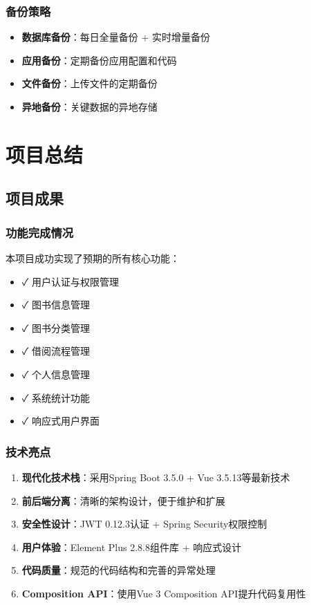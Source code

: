 \documentclass[12pt,a4paper]{article}
\begin{document}
\subsubsection{备份策略}
\begin{itemize}
    \item \textbf{数据库备份}：每日全量备份 + 实时增量备份
    \item \textbf{应用备份}：定期备份应用配置和代码
    \item \textbf{文件备份}：上传文件的定期备份
    \item \textbf{异地备份}：关键数据的异地存储
\end{itemize}

\section{项目总结}

\subsection{项目成果}

\subsubsection{功能完成情况}
本项目成功实现了预期的所有核心功能：

\begin{itemize}
    \item ✓ 用户认证与权限管理
    \item ✓ 图书信息管理
    \item ✓ 图书分类管理
    \item ✓ 借阅流程管理
    \item ✓ 个人信息管理
    \item ✓ 系统统计功能
    \item ✓ 响应式用户界面
\end{itemize}

\subsubsection{技术亮点}
\begin{enumerate}
    \item \textbf{现代化技术栈}：采用Spring Boot 3.5.0 + Vue 3.5.13等最新技术
    \item \textbf{前后端分离}：清晰的架构设计，便于维护和扩展
    \item \textbf{安全性设计}：JWT 0.12.3认证 + Spring Security权限控制
    \item \textbf{用户体验}：Element Plus 2.8.8组件库 + 响应式设计
    \item \textbf{代码质量}：规范的代码结构和完善的异常处理
    \item \textbf{Composition API}：使用Vue 3 Composition API提升代码复用性
\end{enumerate}
\end{document}
